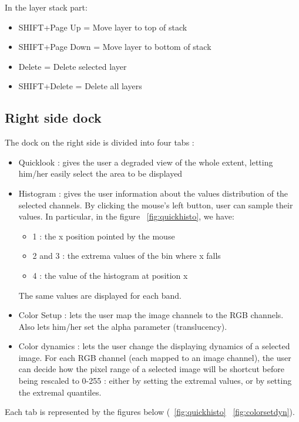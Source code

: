 In the layer stack part:
\begin{itemize}
\item SHIFT+Page Up = Move layer to top of stack
\item SHIFT+Page Down = Move layer to bottom of stack
\item Delete = Delete selected layer
\item SHIFT+Delete = Delete all layers
\end{itemize}


\subsection{Right side dock}
The dock on the right side is divided into four tabs : 
\begin{itemize}
\item Quicklook : gives the user a degraded view of the whole extent, letting him/her easily select the area to be displayed 
\item Histogram : gives the user information about the values distribution of the selected channels. By clicking the mouse's left button, user can sample their values.
In particular, in the figure ~\ref{fig:quickhisto}, we have:
\begin{itemize}
\item 1 : the x position pointed by the mouse
\item 2 and 3 : the extrema values of the bin where x falls
\item 4 : the value of the histogram at position x
\end{itemize}
The same values are displayed for each band.
\item Color Setup : lets the user map the image channels to the RGB channels. Also lets him/her set the alpha parameter (translucency).
\item Color dynamics : lets the user change the displaying dynamics of a selected image. For each RGB channel (each mapped to an image channel), the user can decide how the pixel range of a selected image will be shortcut before being rescaled to 0-255 : either by setting the extremal values, or by setting the extremal quantiles.
\end{itemize}

Each tab is represented by the figures below (~\ref{fig:quickhisto} ~\ref{fig:colorsetdyn}).

